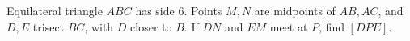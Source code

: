 Equilateral triangle $ABC$ has side 6. Points $M,N$ are midpoints of $AB,AC$, and $D,E$ trisect $BC$, with $D$ closer to $B$. If $DN$ and $EM$ meet at $P$, find $[DPE]$.
